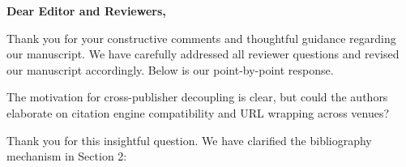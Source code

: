\documentclass{packages/custom/response}
\begin{document}
\makeresponsetitle

\noindent\textbf{Dear Editor and Reviewers,}

Thank you for your constructive comments and thoughtful guidance regarding our manuscript. We have carefully addressed all reviewer questions and revised our manuscript accordingly. Below is our point-by-point response.

\vspace{1em}
\makeresponsetoc
\vspace{1.5em}

\reviewer

\begin{reviewercomment}
The motivation for cross-publisher decoupling is clear, but could the authors elaborate on citation engine compatibility and URL wrapping across venues?
\end{reviewercomment}

\begin{authorresponse}
Thank you for this insightful question. We have clarified the bibliography mechanism in Section 2:

\begin{revisedtext}
\end{revisedtext}
\end{authorresponse}
\end{document}
